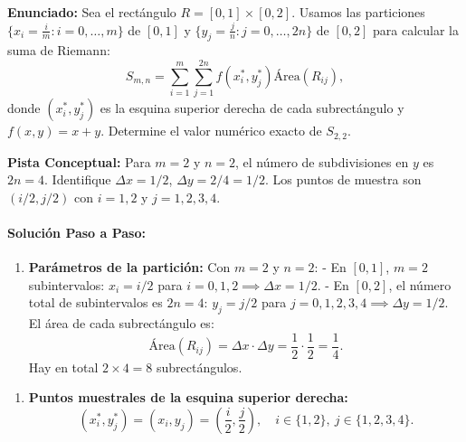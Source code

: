 \documentclass[11pt,a4paper]{article}
\begin{document}
\begin{tcolorbox}[colback=white,colframe=gray!40,arc=1mm,boxrule=0.5pt,left=3mm,right=3mm,top=2mm,bottom=2mm]
\textbf{Enunciado:} Sea el rectángulo $R = [0, 1] \times [0, 2]$. Usamos las particiones $\{x_i = \frac{i}{m} : i=0,\dots,m\}$ de $[0,1]$ y $\{y_j = \frac{j}{n} : j=0,\dots,2n\}$ de $[0,2]$ para calcular la suma de Riemann:
\begin{equation*}
S_{m,n} = \sum_{i=1}^m \sum_{j=1}^{2n} f(x_i^*, y_j^*) \text{Área}(R_{ij}),
\end{equation*}
donde $(x_i^*, y_j^*)$ es la esquina superior derecha de cada subrectángulo y $f(x,y) = x + y$. Determine el valor numérico exacto de $S_{2,2}$.
\end{tcolorbox}

\begin{tcolorbox}[colback=yellow!4,colframe=accentamber!70,arc=1mm,boxrule=0.5pt,left=3mm,right=3mm,top=1.5mm,bottom=1.5mm]
\textbf{Pista Conceptual:} Para $m=2$ y $n=2$, el número de subdivisiones en $y$ es $2n = 4$. Identifique $\Delta x = 1/2$, $\Delta y = 2/4 = 1/2$. Los puntos de muestra son $(i/2, j/2)$ con $i=1,2$ y $j=1,2,3,4$.
\end{tcolorbox}

\paragraph{Solución Paso a Paso:}\par
\begin{enumerate}[label=\textbf{\arabic*.}]
\item \textbf{Parámetros de la partición:}
Con $m = 2$ y $n = 2$:
- En $[0, 1]$, $m = 2$ subintervalos: $x_i = i/2$ para $i=0,1,2 \implies \Delta x = 1/2$.
- En $[0, 2]$, el número total de subintervalos es $2n = 4$: $y_j = j/2$ para $j=0,1,2,3,4 \implies \Delta y = 1/2$.
El área de cada subrectángulo es:
\begin{equation*}
\text{Área}(R_{ij}) = \Delta x \cdot \Delta y = \frac{1}{2} \cdot \frac{1}{2} = \frac{1}{4}.
\end{equation*}
Hay en total $2 \times 4 = 8$ subrectángulos.
\end{enumerate}

\begin{enumerate}[label=\textbf{\arabic*.}]
\item \textbf{Puntos muestrales de la esquina superior derecha:}
\begin{equation*}
(x_i^*, y_j^*) = (x_i, y_j) = \left(\frac{i}{2}, \frac{j}{2}\right), \quad i \in \{1, 2\}, \ j \in \{1, 2, 3, 4\}.
\end{equation*}
\end{enumerate}
\end{document}
